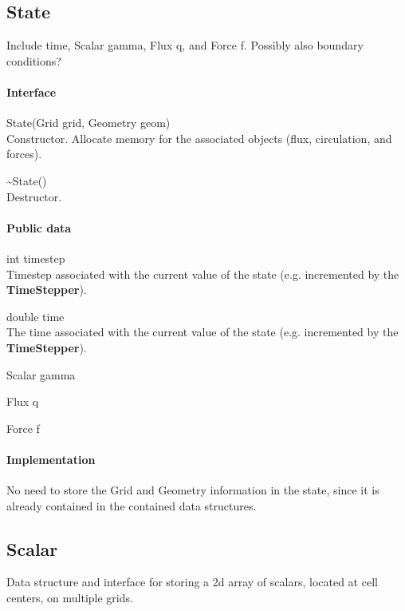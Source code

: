 \documentclass[11pt]{article}
\def\class#1{{\bf #1}} %
\begin{document}
\subsection{State}
Include time, Scalar gamma, Flux q, and Force f.  Possibly also boundary conditions?

\paragraph{Interface}
\begin{description}
	\item State(Grid grid, Geometry geom)\\
		Constructor.  Allocate memory for the associated objects (flux, circulation, and forces).
	\item \~\null State()\\
		Destructor.
\end{description}

\paragraph{Public data}
\begin{description}
	\item int timestep\\
		Timestep associated with the current value of the state (e.g. incremented by the \class{TimeStepper}).
	\item double time\\
		The time associated with the current value of the state (e.g. incremented by the \class{TimeStepper}).
	\item Scalar gamma\\
	\item Flux q\\
	\item Force f
\end{description}

\paragraph{Implementation}
No need to store the Grid and Geometry information in the state, since it is already contained in the contained data structures.

\subsection{Scalar}
Data structure and interface for storing a 2d array of scalars, located at cell centers, on multiple grids.
\end{document}
